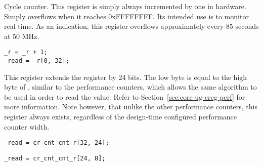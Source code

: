 

Cycle counter. This register is simply always incremented by one in hardware.
Simply overflows when it reaches 0xFFFFFFFF. Its intended use is to monitor
real time. As an indication, this register overflows approximately every 85
seconds at 50 MHz.

\declaration{}
\implementation{}
\begin{lstlisting}
_r = _r + 1;
_read = _r[0, 32];
\end{lstlisting}



This register extends the  register by 24 bits. The low byte is equal
to the high byte of , similar to the performance counters, which
allows the same algorithm to be used in order to read the value. Refer to
Section~\ref{sec:core-ug-creg-perf} for more information. Note however, that
unlike the other performance counters, this register always exists, regardless
of the design-time configured performance counter width.

\implementation{}
\begin{lstlisting}
_read = cr_cnt_cnt_r[32, 24];
\end{lstlisting}
\implementation{}
\begin{lstlisting}
_read = cr_cnt_cnt_r[24, 8];
\end{lstlisting}

